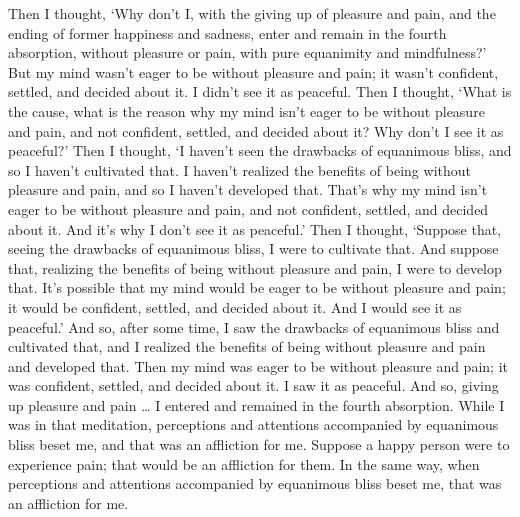 \documentclass[12pt,openany]{book}%
\begin{document}
Then I thought, ‘Why don’t I, with the giving up of pleasure and pain, and the ending of former happiness and sadness, enter and remain in the fourth absorption, without pleasure or pain, with pure equanimity and mindfulness?’ But my mind wasn’t eager to be without pleasure and pain; it wasn’t confident, settled, and decided about it. I didn’t see it as peaceful. Then I thought, ‘What is the cause, what is the reason why my mind isn’t eager to be without pleasure and pain, and not confident, settled, and decided about it? Why don’t I see it as peaceful?’ Then I thought, ‘I haven’t seen the drawbacks of equanimous bliss, and so I haven’t cultivated that. I haven’t realized the benefits of being without pleasure and pain, and so I haven’t developed that. That’s why my mind isn’t eager to be without pleasure and pain, and not confident, settled, and decided about it. And it’s why I don’t see it as peaceful.’ Then I thought, ‘Suppose that, seeing the drawbacks of equanimous bliss, I were to cultivate that. And suppose that, realizing the benefits of being without pleasure and pain, I were to develop that. It’s possible that my mind would be eager to be without pleasure and pain; it would be confident, settled, and decided about it. And I would see it as peaceful.’ And so, after some time, I saw the drawbacks of equanimous bliss and cultivated that, and I realized the benefits of being without pleasure and pain and developed that. Then my mind was eager to be without pleasure and pain; it was confident, settled, and decided about it. I saw it as peaceful. And so, giving up pleasure and pain … I entered and remained in the fourth absorption. While I was in that meditation, perceptions and attentions accompanied by equanimous bliss beset me, and that was an affliction for me. Suppose a happy person were to experience pain; that would be an affliction for them. In the same way, when perceptions and attentions accompanied by equanimous bliss beset me, that was an affliction for me. 
\end{document}
